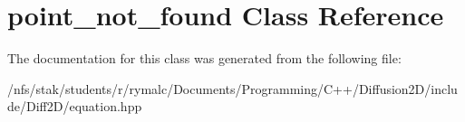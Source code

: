 \hypertarget{classpoint__not__found}{
\section{point\_\-not\_\-found Class Reference}
\label{classpoint__not__found}
}


The documentation for this class was generated from the following file:\begin{DoxyCompactItemize}
\item 
/nfs/stak/students/r/rymalc/Documents/Programming/C++/Diffusion2D/include/Diff2D/equation.hpp\end{DoxyCompactItemize}
